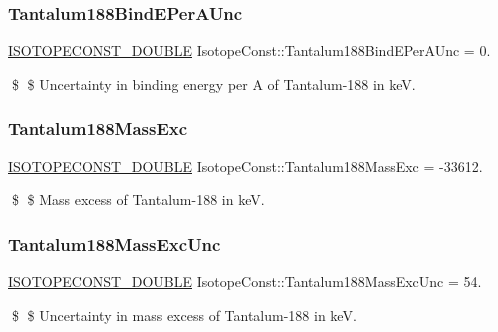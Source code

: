 \subsubsection{\texorpdfstring{Tantalum188\+Bind\+E\+Per\+A\+Unc}{Tantalum188BindEPerAUnc}}
{\footnotesize\ttfamily \mbox{\hyperlink{group___isotope_const-_macros_ga8f45a7272ce02c0b4c65c44636ed719a}{I\+S\+O\+T\+O\+P\+E\+C\+O\+N\+S\+T\+\_\+\+D\+O\+U\+B\+LE}} Isotope\+Const\+::\+Tantalum188\+Bind\+E\+Per\+A\+Unc = 0.}

\$ \$ Uncertainty in binding energy per A of Tantalum-\/188 in keV. \mbox{\label{group___isotope_const-_tantalum-_ta188_gacd8e315ae92b3cd43ef7856eb8709cc6}} 
\subsubsection{\texorpdfstring{Tantalum188\+Mass\+Exc}{Tantalum188MassExc}}
{\footnotesize\ttfamily \mbox{\hyperlink{group___isotope_const-_macros_ga8f45a7272ce02c0b4c65c44636ed719a}{I\+S\+O\+T\+O\+P\+E\+C\+O\+N\+S\+T\+\_\+\+D\+O\+U\+B\+LE}} Isotope\+Const\+::\+Tantalum188\+Mass\+Exc = -\/33612.}

\$ \$ Mass excess of Tantalum-\/188 in keV. \mbox{\label{group___isotope_const-_tantalum-_ta188_gad22fa56917ed04244588abeb58a9c116}} 
\subsubsection{\texorpdfstring{Tantalum188\+Mass\+Exc\+Unc}{Tantalum188MassExcUnc}}
{\footnotesize\ttfamily \mbox{\hyperlink{group___isotope_const-_macros_ga8f45a7272ce02c0b4c65c44636ed719a}{I\+S\+O\+T\+O\+P\+E\+C\+O\+N\+S\+T\+\_\+\+D\+O\+U\+B\+LE}} Isotope\+Const\+::\+Tantalum188\+Mass\+Exc\+Unc = 54.}

\$ \$ Uncertainty in mass excess of Tantalum-\/188 in keV. \mbox{\label{group___isotope_const-_tantalum-_ta188_ga2b395f6f2262f135de4d45d89b075531}} 

